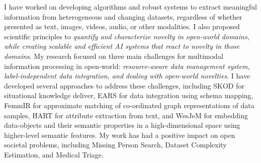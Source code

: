 \documentclass[11pt]{article}
\renewcommand*\paragraph[1]{}
\begin{document}
\paragraph{1 and P1) current research portfolio, accomplishments, and future research goals}

I have worked on developing algorithms and robust systems to extract meaningful information from heterogeneous and changing datasets, regardless of whether presented as text, images, videos, audio, or other modalities.
I also proposed scientific principles to \textit{quantify and characterize novelty in open-world domains, while creating scalable and efficient AI systems that react to novelty in those domains}.
My research focused on three main challenges for multimodal information processing in open-world: \textit{resource-aware data management system, label-independent data integration, and dealing with open-world novelties}. I have developed several approaches to address these challenges, including SKOD for situational knowledge deliver, EARS for data integration using schema mapping, FemmIR for approximate matching of co-ordinated graph representations of data samples, HART for attribute extraction from text, and WesJeM for embedding data-objects and their semantic properties in a high-dimensional space using higher-level semantic features.
My work has had a positive impact on open societal problems, including Missing Person Search, Dataset Complexity Estimation, and Medical Triage. 
\end{document}

